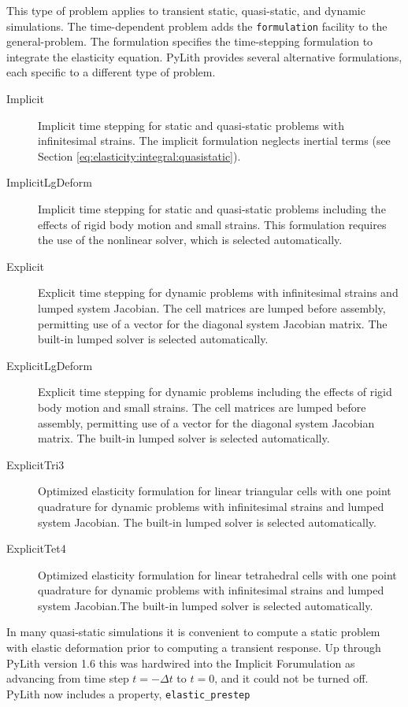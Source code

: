 This type of problem applies to transient static, quasi-static, and
dynamic simulations. The time-dependent problem adds the \texttt{formulation}
facility to the general-problem. The formulation specifies the time-stepping
formulation to integrate the elasticity equation. PyLith provides
several alternative formulations, each specific to a different type
of problem.
\begin{description}
\item [{Implicit}] Implicit time stepping for static and quasi-static problems
with infinitesimal strains. The implicit formulation neglects inertial
terms (see Section \ref{eq:elasticity:integral:quasistatic}). 
\item [{ImplicitLgDeform}] Implicit time stepping for static and quasi-static
problems including the effects of rigid body motion and small strains.
This formulation requires the use of the nonlinear solver, which is
selected automatically.
\item [{Explicit}] Explicit time stepping for dynamic problems with infinitesimal
strains and lumped system Jacobian. The cell matrices are lumped before
assembly, permitting use of a vector for the diagonal system Jacobian
matrix. The built-in lumped solver is selected automatically.
\item [{ExplicitLgDeform}] Explicit time stepping for dynamic problems
including the effects of rigid body motion and small strains. The
cell matrices are lumped before assembly, permitting use of a vector
for the diagonal system Jacobian matrix. The built-in lumped solver
is selected automatically.
\item [{ExplicitTri3}] Optimized elasticity formulation for linear triangular
cells with one point quadrature for dynamic problems with infinitesimal
strains and lumped system Jacobian. The built-in lumped solver is
selected automatically.
\item [{ExplicitTet4}] Optimized elasticity formulation for linear tetrahedral
cells with one point quadrature for dynamic problems with infinitesimal
strains and lumped system Jacobian.The built-in lumped solver is selected
automatically.
\end{description}
In many quasi-static simulations it is convenient to compute a static
problem with elastic deformation prior to computing a transient response.
Up through PyLith version 1.6 this was hardwired into the Implicit
Forumulation as advancing from time step $t=-\Delta t$ to $t=0$,
and it could not be turned off. PyLith now includes a property, \texttt{elastic\_prestep}
